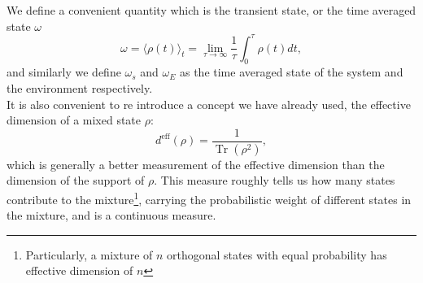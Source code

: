 \indent We define a convenient quantity which is the transient state, or the time averaged state $\omega$
\begin{equation}
\omega=\langle\rho(t)\rangle_{t}=\lim _{\tau \rightarrow \infty} \frac{1}{\tau} \int_{0}^{\tau} \rho(t) d t,
\label{CH1:average_time_state}
\end{equation}
and similarly we define $\omega_s$ and $\omega_E$ as the time averaged state of the system and the environment respectively.\\

\indent It is also convenient to re introduce a concept we have already used, the effective dimension of a mixed state $\rho$:
\begin{equation}
d^{\mathrm{eff}}(\rho)=\frac{1}{\operatorname{Tr}\left(\rho^{2}\right)},
\label{CH1:Effective_dimension}
\end{equation}
which is generally a better measurement of the effective dimension than the dimension of the support of $\rho$. This measure roughly tells us how many states contribute to the mixture\footnote{Particularly, a mixture of $n$ orthogonal states with equal probability has effective dimension of $n$ }, carrying the probabilistic weight of different states in the mixture, and is a continuous measure.\\

